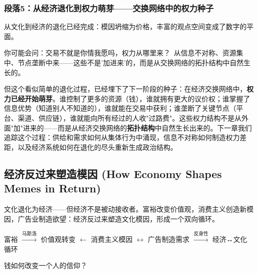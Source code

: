 \documentclass[../main.tex]{subfiles}
\begin{document}
	\subsubsection*{段落5：从经济退化到权力萌芽——交换网络中的权力种子}

	从文化到经济的退化已经完成：模因坍缩为价格，丰富的观点空间变成了数字的平面。

	\begin{tcolorbox}[colback=yellow!5, title=\textit{读者行为预测}]

		你可能会问：交易不就是你情我愿吗，权力从哪里来？\ 从信息不对称、资源集中、节点垄断中来——这些不是'加进来'的，而是从交换网络的拓扑结构中自然生长的。

	\end{tcolorbox}

但这个看似简单的退化过程，已经埋下了下一阶段的种子：在经济交换网络中，\textbf{权力已经开始萌芽}。谁控制了更多的资源（钱），谁就拥有更大的议价权；谁掌握了信息优势（知道别人不知道的），谁就能在交易中获利；谁垄断了关键节点（平台、渠道、供应链），谁就能向所有经过的人收"过路费"。这些权力结构不是从外面"加"进来的——而是从经济交换网络的\textbf{拓扑结构}中自然生长出来的。下一章我们追踪这个过程：供给和需求如何从集体行为中涌现，信息不对称如何制造权力差距，以及经济系统如何在退化的尽头重新生成政治结构。

	\subsection{经济反过来塑造模因 (How Economy Shapes Memes in Return)}

	\begin{motivation}

		文化退化为经济——但经济不是被动接收者。富裕改变价值观，消费主义创造新模因，广告业制造欲望：经济反过来塑造文化模因，形成一个双向循环。

	\end{motivation}

	\begin{logicmap}

		富裕 $\xrightarrow{\text{马斯洛}}$ 价值观转变 $\leftarrow$ 消费主义模因 $\leftrightarrow$ 广告制造需求 $\xrightarrow{\text{反身性}}$ 经济↔文化循环

	\end{logicmap}

	\begin{questionbox}

		钱如何改变一个人的信仰？

	\end{questionbox}
\end{document}
